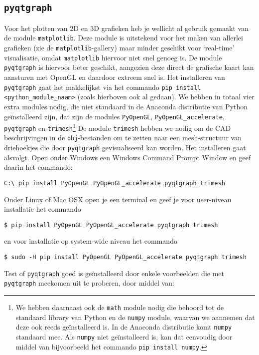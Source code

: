 \documentclass[a4paper,11pt]{article}
\begin{document}
\subsection{\texttt{pyqtgraph}}
Voor het plotten van 2D en 3D grafieken heb je wellicht al gebruik gemaakt van
de module \texttt{matplotlib}. Deze module is uitstekend voor het maken van
allerlei grafieken (zie de \texttt{matplotlib}-gallery) maar minder geschikt
voor `real-time' visualisatie, omdat \texttt{matplotlib} hiervoor niet snel
genoeg is. De module \texttt{pyqtgraph} is hiervoor beter geschikt, aangezien
deze direct de grafische kaart kan aansturen met OpenGL en daardoor extreem
snel is. Het installeren van \texttt{pyqtgraph} gaat het makkelijkst via het
commando \sloppy \texttt{pip install <python\_module\_naam>} (zoals hierboven ook al gedaan). We hebben in
totaal vier extra modules nodig, die niet standaard in de Anaconda distributie
van Python ge\"installeerd zijn, dat zijn de modules \texttt{PyOpenGL},
\texttt{PyOpenGL\_accelerate}, \texttt{pyqtgraph} en
\texttt{trimesh}\footnote{We hebben daarnaast ook de \texttt{math} module
  nodig die behoord tot de standaard library van Python en de \texttt{numpy}
module, waarvan we aannemen dat deze ook reeds ge\"installeerd is. In de
Anaconda distributie komt \texttt{numpy} standaard mee. Als \texttt{numpy}
niet ge\"installeerd is, kan dat eenvoudig door middel van bijvoorbeeld het
commando \texttt{pip install numpy}.} De module \texttt{trimesh} hebben we nodig om de CAD beschrijvingen in de \texttt{obj}-bestanden om te zetten naar een mesh-structuur  van driehoekjes die door \texttt{pyqtgraph} gevisualiseerd kan worden. Het installeren gaat alsvolgt. Open onder Windows een Windows Command Prompt Window en geef daarin het commando:
\begin{verbatim}
C:\ pip install PyOpenGL PyOpenGL_accelerate pyqtgraph trimesh
\end{verbatim} 
Onder Linux of Mac OSX open je een terminal en geef je voor user-niveau installatie het commando
\begin{verbatim}
$ pip install PyOpenGL PyOpenGL_accelerate pyqtgraph trimesh
\end{verbatim} 
en voor installatie op system-wide niveau het commando 
\begin{verbatim}
$ sudo -H pip install PyOpenGL PyOpenGL_accelerate pyqtgraph trimesh
\end{verbatim} 
Test of \texttt{pyqtgraph} goed is ge\"installeerd door enkele voorbeelden die met \texttt{pyqtgraph} meekomen uit te proberen, door middel van:
\end{document}
